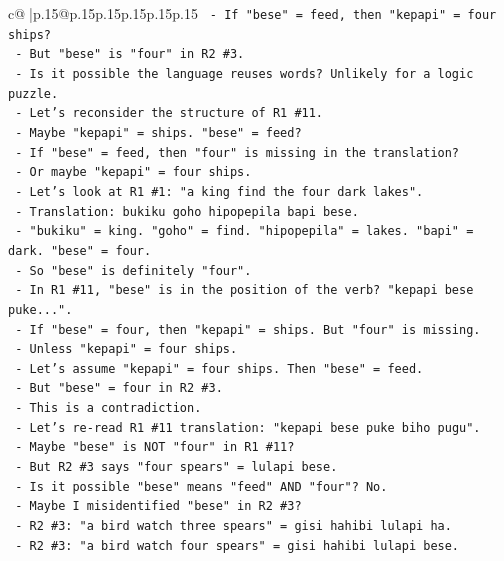 \documentclass{article}
\begin{document}
{\begin{supertabular}{c@{$\;$}|p{.15\linewidth}@{}p{.15\linewidth}p{.15\linewidth}p{.15\linewidth}p{.15\linewidth}p{.15\linewidth}}
{{{\texttt{        {-} If "bese" = feed, then "kepapi" = four ships?} \\
\texttt{        {-} But "bese" is "four" in R2 \#3.} \\
\texttt{        {-} Is it possible the language reuses words? Unlikely for a logic puzzle.} \\
\texttt{        {-} Let's reconsider the structure of R1 \#11.} \\
\texttt{        {-} Maybe "kepapi" = ships. "bese" = feed?} \\
\texttt{        {-} If "bese" = feed, then "four" is missing in the translation?} \\
\texttt{        {-} Or maybe "kepapi" = four ships.} \\
\texttt{        {-} Let's look at R1 \#1: "a king find the four dark lakes".} \\
\texttt{        {-} Translation: bukiku goho hipopepila bapi bese.} \\
\texttt{        {-} "bukiku" = king. "goho" = find. "hipopepila" = lakes. "bapi" = dark. "bese" = four.} \\
\texttt{        {-} So "bese" is definitely "four".} \\
\texttt{        {-} In R1 \#11, "bese" is in the position of the verb? "kepapi bese puke...".} \\
\texttt{        {-} If "bese" = four, then "kepapi" = ships. But "four" is missing.} \\
\texttt{        {-} Unless "kepapi" = four ships.} \\
\texttt{        {-} Let's assume "kepapi" = four ships. Then "bese" = feed.} \\
\texttt{        {-} But "bese" = four in R2 \#3.} \\
\texttt{        {-} This is a contradiction.} \\
\texttt{        {-} Let's re{-}read R1 \#11 translation: "kepapi bese puke biho pugu".} \\
\texttt{        {-} Maybe "bese" is NOT "four" in R1 \#11?} \\
\texttt{        {-} But R2 \#3 says "four spears" = lulapi bese.} \\
\texttt{        {-} Is it possible "bese" means "feed" AND "four"? No.} \\
\texttt{        {-} Maybe I misidentified "bese" in R2 \#3?} \\
\texttt{        {-} R2 \#3: "a bird watch three spears" = gisi hahibi lulapi ha.} \\
\texttt{        {-} R2 \#3: "a bird watch four spears" = gisi hahibi lulapi bese.} \\
}}}
\end{supertabular}}
\end{document}
